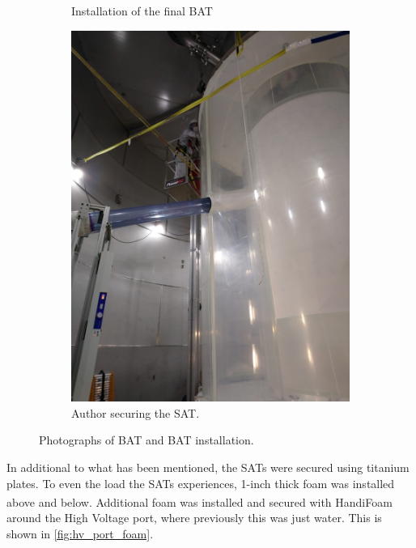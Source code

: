 \begin{figure}[!tbph]
\begin{subfigure}{.5\textwidth}
  \caption{Installation of the final BAT}
  \label{fig:BAT_installation}
  \end{subfigure}
  \begin{subfigure}{.5\textwidth}
  \centering
  \includegraphics[angle=-90, width=\linewidth]{Figures/Construction/SAT_titanium_plate.JPG}
  \caption{Author securing the SAT.}
  \label{fig:SAT_titanium_installation}
  \end{subfigure}
\caption{Photographs of BAT and BAT installation.}
\label{fig:sat_and_bat_installation}
\end{figure}

\par
In additional to what has been mentioned, the SATs were secured using titanium plates.
To even the load the SATs experiences, 1-inch thick foam was installed above and below.
Additional foam was installed and secured with HandiFoam\textsuperscript{\textregistered} around the High Voltage port, where previously this was just water.
This is shown in \autoref{fig:hv_port_foam}.

